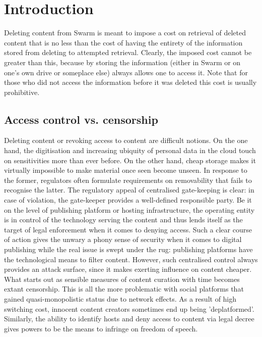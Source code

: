 
\maketitle

\tableofcontents
\listoftheorems[ignoreall,show={definition,corollary,lemma,theorem}]

\section{Introduction}


Deleting content from Swarm is meant to impose a cost on retrieval of deleted content that is no less than the cost of having the entirety of the information stored from deleting to attempted retrieval. Clearly, the imposed cost cannot be greater than  this, because by storing the information (either in Swarm or on one's own drive or someplace else) always allows one to access it. Note that for those who did not access the information before it was deleted this cost is usually prohibitive.


\subsection{Access control vs. censorship}

Deleting content or revoking access to content are difficult notions. On the one hand, the digitisation and increasing ubiquity of personal data in the cloud touch on sensitivities more than ever before. On the other hand, cheap storage makes it virtually impossible to make material once seen become unseen.
In response to the former, regulators often formulate requirements on removability that fails to recognise the latter. The regulatory appeal of centralised gate-keeping is clear: in case of violation, the gate-keeper provides a  well-defined responsible party. Be it on the level of publishing platform or hosting infrastructure, the  operating entity is in control of the technology serving the content and thus lends itself as the target of legal enforcement when it comes to denying access. Such a clear course of action gives the unwary a phony sense of security when it comes to digital publishing while the real issue is swept under the rug: publishing platforms have the technological means to filter content. However, such centralised control always provides an attack surface, since it makes exerting influence on content cheaper.  What starts out as sensible measures of content curation with time becomes extant censorship. This is all the more problematic with social platforms that gained quasi-monopolistic status due to network effects. As a result of high switching cost, innocent content creators sometimes end up being 'deplatformed'. Similarly, the ability to identify hosts and deny access to content via legal decree gives powers to be the means to infringe on freedom of speech. 

